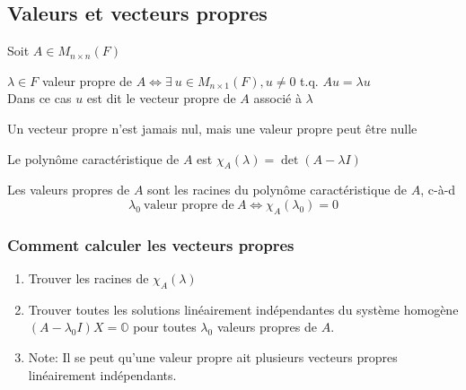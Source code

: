 
\subsection{Valeurs et vecteurs propres}
Soit $A \in M_{n \times n}(F)$
\begin{definition}
    $\lambda \in F$ valeur propre de $A \iff \exists \ u \in M_{n \times 1}(F), u \neq 0$ t.q. $Au = \lambda u$ \\
    Dans ce cas $u$ est dit le vecteur propre de $A$ associé à $\lambda$
\end{definition}
\begin{remark}
    Un vecteur propre n'est jamais nul, mais une valeur propre peut être nulle
\end{remark}
\begin{definition}
    Le polynôme caractéristique de $A$ est $\chi_A(\lambda) = \det(A - \lambda I)$
\end{definition}
\begin{theorem}
    Les valeurs propres de $A$ sont les racines du polynôme caractéristique de $A$, c-à-d
    \[
        \lambda_0 \ \text{valeur propre de} \ A \iff \chi_A(\lambda_0) = 0
    \]
\end{theorem}
\subsubsection{Comment calculer les vecteurs propres}
\begin{enumerate}
    \item Trouver les racines de $\chi_A(\lambda)$
    \item Trouver toutes les solutions linéairement indépendantes du système homogène $(A - \lambda_0 I)X = \mathbb{O}$
          pour toutes $\lambda_0$ valeurs propres de $A$.
    \item[] Note: Il se peut  qu'une valeur propre ait plusieurs vecteurs propres linéairement indépendants. %
\end{enumerate}
